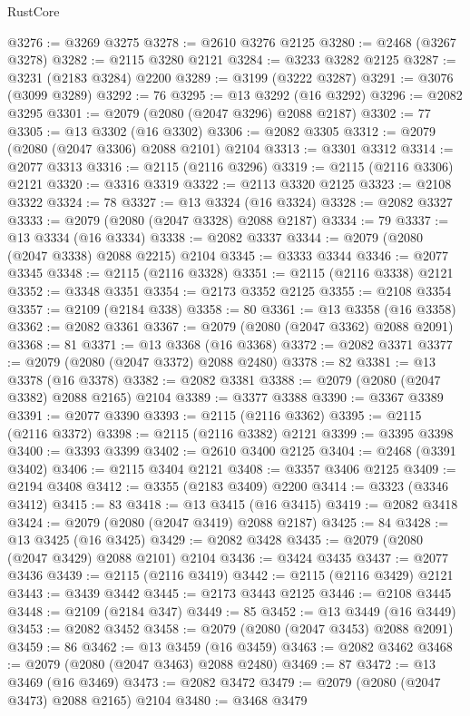 \begin{lexlean}{RustCore}
\begin{coremodule}
@3276 := @3269 @3275
@3278 := @2610 @3276 @2125
@3280 := @2468 (@3267 @3278)
@3282 := @2115 @3280 @2121
@3284 := @3233 @3282 @2125
@3287 := @3231 (@2183 @3284) @2200
@3289 := @3199 (@3222 @3287)
@3291 := @3076 (@3099 @3289)
@3292 := 76
@3295 := @13 @3292 (@16 @3292)
@3296 := @2082 @3295
@3301 := @2079 (@2080 (@2047 @3296) @2088 @2187)
@3302 := 77
@3305 := @13 @3302 (@16 @3302)
@3306 := @2082 @3305
@3312 := @2079 (@2080 (@2047 @3306) @2088 @2101) @2104
@3313 := @3301 @3312
@3314 := @2077 @3313
@3316 := @2115 (@2116 @3296)
@3319 := @2115 (@2116 @3306) @2121
@3320 := @3316 @3319
@3322 := @2113 @3320 @2125
@3323 := @2108 @3322
@3324 := 78
@3327 := @13 @3324 (@16 @3324)
@3328 := @2082 @3327
@3333 := @2079 (@2080 (@2047 @3328) @2088 @2187)
@3334 := 79
@3337 := @13 @3334 (@16 @3334)
@3338 := @2082 @3337
@3344 := @2079 (@2080 (@2047 @3338) @2088 @2215) @2104
@3345 := @3333 @3344
@3346 := @2077 @3345
@3348 := @2115 (@2116 @3328)
@3351 := @2115 (@2116 @3338) @2121
@3352 := @3348 @3351
@3354 := @2173 @3352 @2125
@3355 := @2108 @3354
@3357 := @2109 (@2184 @338)
@3358 := 80
@3361 := @13 @3358 (@16 @3358)
@3362 := @2082 @3361
@3367 := @2079 (@2080 (@2047 @3362) @2088 @2091)
@3368 := 81
@3371 := @13 @3368 (@16 @3368)
@3372 := @2082 @3371
@3377 := @2079 (@2080 (@2047 @3372) @2088 @2480)
@3378 := 82
@3381 := @13 @3378 (@16 @3378)
@3382 := @2082 @3381
@3388 := @2079 (@2080 (@2047 @3382) @2088 @2165) @2104
@3389 := @3377 @3388
@3390 := @3367 @3389
@3391 := @2077 @3390
@3393 := @2115 (@2116 @3362)
@3395 := @2115 (@2116 @3372)
@3398 := @2115 (@2116 @3382) @2121
@3399 := @3395 @3398
@3400 := @3393 @3399
@3402 := @2610 @3400 @2125
@3404 := @2468 (@3391 @3402)
@3406 := @2115 @3404 @2121
@3408 := @3357 @3406 @2125
@3409 := @2194 @3408
@3412 := @3355 (@2183 @3409) @2200
@3414 := @3323 (@3346 @3412)
@3415 := 83
@3418 := @13 @3415 (@16 @3415)
@3419 := @2082 @3418
@3424 := @2079 (@2080 (@2047 @3419) @2088 @2187)
@3425 := 84
@3428 := @13 @3425 (@16 @3425)
@3429 := @2082 @3428
@3435 := @2079 (@2080 (@2047 @3429) @2088 @2101) @2104
@3436 := @3424 @3435
@3437 := @2077 @3436
@3439 := @2115 (@2116 @3419)
@3442 := @2115 (@2116 @3429) @2121
@3443 := @3439 @3442
@3445 := @2173 @3443 @2125
@3446 := @2108 @3445
@3448 := @2109 (@2184 @347)
@3449 := 85
@3452 := @13 @3449 (@16 @3449)
@3453 := @2082 @3452
@3458 := @2079 (@2080 (@2047 @3453) @2088 @2091)
@3459 := 86
@3462 := @13 @3459 (@16 @3459)
@3463 := @2082 @3462
@3468 := @2079 (@2080 (@2047 @3463) @2088 @2480)
@3469 := 87
@3472 := @13 @3469 (@16 @3469)
@3473 := @2082 @3472
@3479 := @2079 (@2080 (@2047 @3473) @2088 @2165) @2104
@3480 := @3468 @3479

\end{coremodule}
\end{lexlean}
